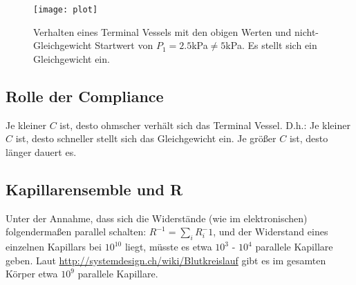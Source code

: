 \documentclass[a4paper,12pt]{scrartcl}
\begin{document}
\begin{figure}[!htb]
  \centering
  \texttt{[image: plot]}
  \caption{Verhalten eines Terminal Vessels mit den obigen Werten und nicht-Gleichgewicht Startwert von $P_1 = 2.5$kPa$\neq 5$kPa. Es stellt sich ein Gleichgewicht ein.}
  \label{}
\end{figure}

\subsection*{Rolle der Compliance}
Je kleiner $C$ ist, desto ohmscher verhält sich das Terminal Vessel. D.h.: Je kleiner $C$ ist, desto schneller stellt sich das Gleichgewicht ein. Je größer $C$ ist, desto länger dauert es.


\subsection{Kapillarensemble und R}
Unter der Annahme, dass sich die Widerstände (wie im elektronischen) folgendermaßen parallel schalten: $R^{-1} = \sum_i R_i^-1$, und der Widerstand eines einzelnen Kapillars bei $10^{10}$ liegt, müsste es etwa $10^3$ - $10^4$ parallele Kapillare geben. Laut \url{http://systemdesign.ch/wiki/Blutkreislauf} gibt es im gesamten Körper etwa $10^9$ parallele Kapillare.
\end{document}
